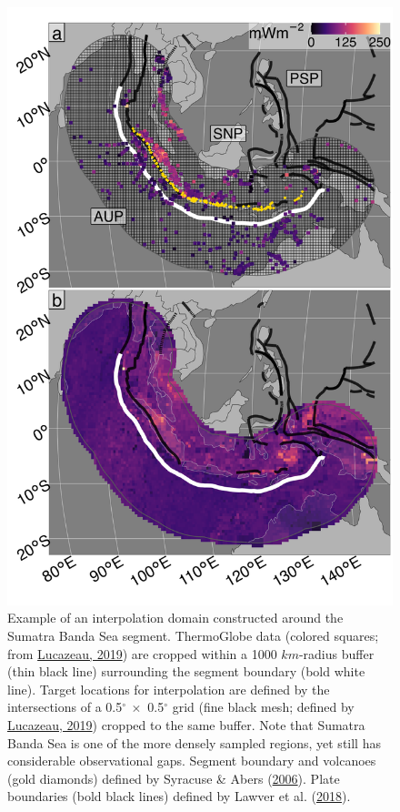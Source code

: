 \begin{figure}[htbp]

{\centering \includegraphics[width=1\linewidth,]{assets/figs/chpt3/SumatraBandaSeaComp} 

}

\caption[Example of an interpolation domain constructed around Sumatra Banda Sea]{Example of an interpolation domain constructed around the Sumatra Banda Sea segment. ThermoGlobe data (colored squares; from \protect\hyperlink{ref-lucazeau2019}{Lucazeau, 2019}) are cropped within a 1000 \(km\)-radius buffer (thin black line) surrounding the segment boundary (bold white line). Target locations for interpolation are defined by the intersections of a 0.5\(^\circ\ \times\) 0.5\(^\circ\) grid (fine black mesh; defined by \protect\hyperlink{ref-lucazeau2019}{Lucazeau, 2019}) cropped to the same buffer. Note that Sumatra Banda Sea is one of the more densely sampled regions, yet still has considerable observational gaps. Segment boundary and volcanoes (gold diamonds) defined by Syracuse \& Abers (\protect\hyperlink{ref-syracuse2006}{2006}). Plate boundaries (bold black lines) defined by Lawver et al. (\protect\hyperlink{ref-lawver2018}{2018}).}\label{fig:domainConstruct}
\end{figure}


